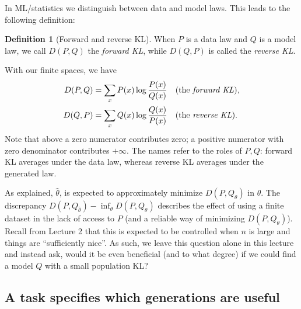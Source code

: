 \documentclass[11pt,twoside]{article}
\newcommand{\KL}{D}
\theoremstyle{definition}
\newtheorem{definition}[theorem]{Definition}
\theoremstyle{remark}
\begin{document}
In ML/statistics we distinguish between data and model laws.
This leads to the following definition:
\begin{definition}[Forward and reverse KL]
When  \(P\) is a data law and \(Q\) is a model law, we call
$\KL(P, Q)$ the \emph{forward KL}, while
$\KL(Q, P)$ is called the \emph{reverse KL}.
\end{definition}
With our finite spaces, we have
\[
  \begin{aligned}
  \KL(P, Q)&=\sum_xP(x)\log\frac{P(x)}{Q(x)}
    &&\text{(the \emph{forward KL})},\\
  \KL(Q, P)&=\sum_xQ(x)\log\frac{Q(x)}{P(x)}
    &&\text{(the \emph{reverse KL})}.
  \end{aligned}
\]
Note that above a zero numerator contributes zero;
a positive numerator with zero denominator contributes \(+\infty\).
The names refer to the roles of \(P,Q\): forward KL averages under the
data law, whereas reverse KL averages under the generated law.

As explained, $\widehat\theta$, is expected to approximately minimize $\KL(P, Q_\theta)$ in $\theta$.
The discrepancy $\KL(P, Q_{\widehat\theta})- \inf_{\theta}\KL(P, Q_\theta)$
describes the effect of using a finite dataset in the lack of access to $P$ (and a reliable way of minimizing $\KL(P, Q_\theta)$).
Recall from Lecture 2 that this is expected to be controlled when $n$ is large and things are ``sufficiently nice''.
As such, we leave this question alone in this lecture and instead ask, would it be even
beneficial (and to what degree) if we could find a model $Q$ with a small population KL?


\subsection{A task specifies which generations are useful}
\end{document}
